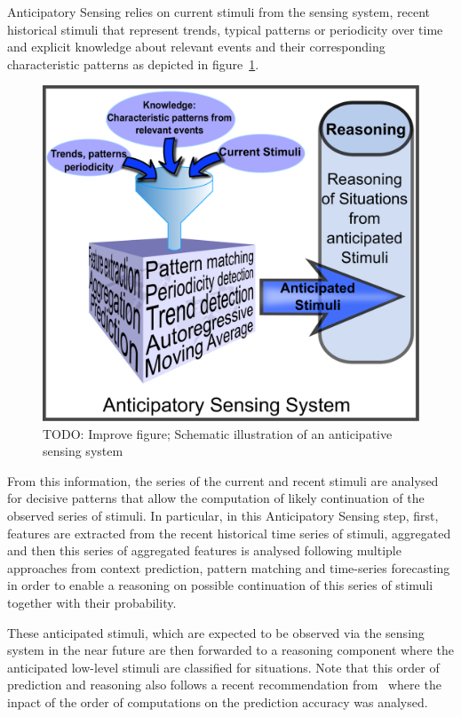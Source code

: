 Anticipatory Sensing relies on current stimuli from the sensing system, recent historical stimuli that represent trends, typical patterns or periodicity over time and explicit knowledge about relevant events and their corresponding characteristic patterns as depicted in figure~\ref{figureAnticipativeSensingSystem}.
\begin{figure}
 \includegraphics[width=\columnwidth]{Figures/AnticipativeSensingSystem2.pdf}
 \caption{TODO: Improve figure; Schematic illustration of an anticipative sensing system}
 \label{figureAnticipativeSensingSystem}
\end{figure}

From this information, the series of the current and recent stimuli are analysed for decisive patterns that allow the computation of likely continuation of the observed series of stimuli.
In particular, in this Anticipatory Sensing step, first, features are extracted from the recent historical time series of stimuli, aggregated and then this series of aggregated features is analysed following multiple approaches from context prediction, pattern matching and time-series forecasting in order to enable a reasoning on possible continuation of this series of stimuli together with their probability.

These anticipated stimuli, which are expected to be observed via the sensing system in the near future are then forwarded to a reasoning component where the anticipated low-level stimuli are classified for situations.
Note that this order of prediction and reasoning also follows a recent recommendation from~\cite{4027} where the inpact of the order of computations on the prediction accuracy was analysed.

